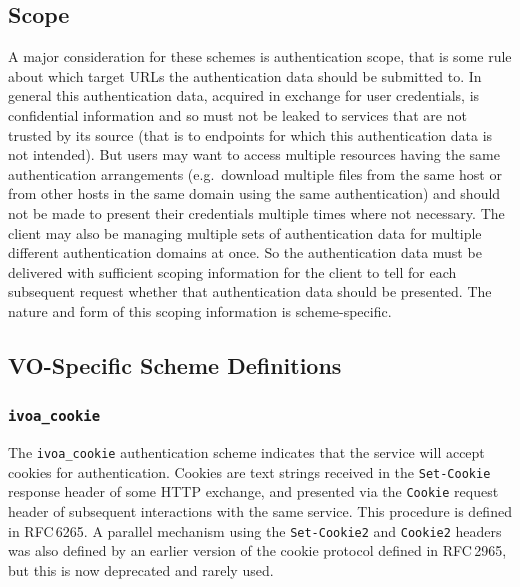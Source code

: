 \documentclass[11pt,a4paper]{ivoa}
\newcommand{\rfc}[1]{RFC\,#1}
\begin{document}


\subsection{Scope}\label{sec:scope}

A major consideration for these schemes is authentication scope,
that is some rule about which target URLs the authentication data
should be submitted to.
In general this authentication data,
acquired in exchange for user credentials,
is confidential information and so must not be leaked to services
that are not trusted by its source
(that is to endpoints for which this authentication data is
not intended).
But users may want to access multiple resources
having the same authentication arrangements
(e.g.\ download multiple files from the same host or from
other hosts in the same domain using the same authentication)
and should not be made to present their credentials
multiple times where not necessary.
The client may also be managing multiple sets of authentication data
for multiple different authentication domains at once.
So the authentication data must be delivered with sufficient scoping
information for the client to tell for each subsequent request
whether that authentication data should be presented.
The nature and form of this scoping information is scheme-specific.



\subsection{VO-Specific Scheme Definitions}\label{sec:voschemes}

\subsubsection{\mbox{\tt ivoa\_cookie}}\label{sec:ivoa-cookie}

The \verb|ivoa_cookie| authentication scheme indicates that the service
will accept cookies for authentication.
Cookies are text strings received in the {\tt Set-Cookie}
response header of some HTTP exchange,
and presented via the {\tt Cookie} request header of subsequent
interactions with the same service.
This procedure is defined in \rfc{6265}.
A parallel mechanism using the {\tt Set-Cookie2} and {\tt Cookie2}
headers was also defined by an earlier version of the cookie protocol
defined in \rfc{2965}, but this is now deprecated and rarely used.
\end{document}
